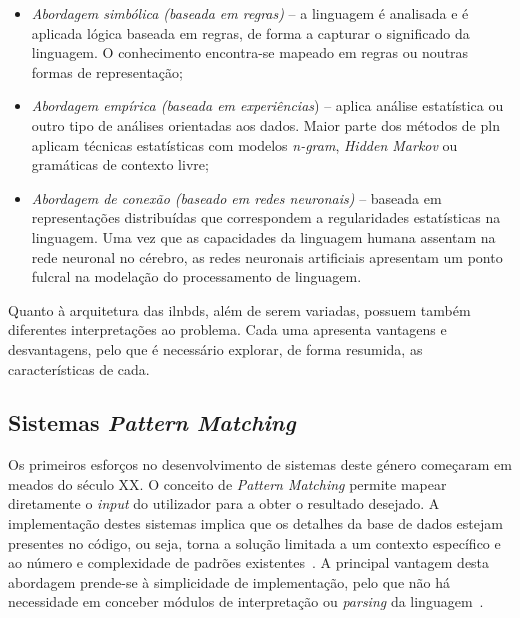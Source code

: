 \begin{itemize}
    \item 
    {
        \textit{Abordagem simbólica (baseada em regras)} -- a linguagem é analisada e é aplicada lógica baseada em regras, de forma a capturar o significado da linguagem. O conhecimento encontra-se mapeado em regras ou noutras formas de representação;
    }
    \item
    {
        \textit{Abordagem empírica (baseada em experiências}) -- aplica análise estatística ou outro tipo de análises orientadas aos dados. Maior parte dos métodos de \gls{pln} aplicam técnicas estatísticas com modelos \textit{n-gram}, \textit{Hidden Markov} ou gramáticas de contexto livre;
    }
    \item
    {
        \textit{Abordagem de conexão (baseado em redes neuronais)} -- baseada em representações distribuídas que correspondem a regularidades estatísticas na linguagem. Uma vez que as capacidades da linguagem humana assentam na rede neuronal no cérebro, as redes neuronais artificiais apresentam um ponto fulcral na modelação do processamento de linguagem.
    }
\end{itemize}

Quanto à arquitetura das \glspl{ilnbd}, além de serem variadas, possuem também diferentes interpretações ao problema. Cada uma apresenta vantagens e desvantagens, pelo que é necessário explorar, de forma resumida, as características de cada.

\subsection{Sistemas \textit{Pattern Matching}}
Os primeiros esforços no desenvolvimento de sistemas deste género começaram em meados do século XX. O conceito de \textit{Pattern Matching} permite mapear diretamente o \textit{input} do utilizador para a obter o resultado desejado. A implementação destes sistemas implica que os detalhes da base de dados estejam presentes no código, ou seja, torna a solução limitada a um contexto específico e ao número e complexidade de padrões existentes~\parencite{nlidb_brief_review}. A principal vantagem desta abordagem prende-se à simplicidade de implementação, pelo que não há necessidade em conceber módulos de interpretação ou \textit{parsing} da linguagem~\parencite{nlidb_brief_review, survey_nlidb}.

